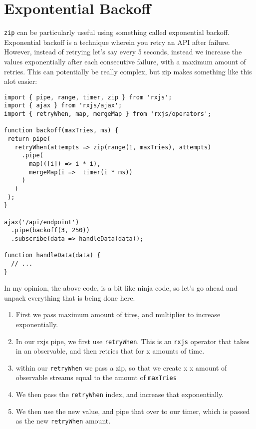 \section{Expontential Backoff}
\lstinline{zip} can be particularly useful using something called exponential 
backoff. Exponential backoff is a technique wherein you retry an API after 
failure. However, instead of retrying let's say every 5 seconds, instead 
we increase the values exponentially after each consecutive failure, with a 
maximum amount of retries. This can potentially be really complex, but zip 
makes something like this alot easier:

\begin{lstlisting}
import { pipe, range, timer, zip } from 'rxjs';
import { ajax } from 'rxjs/ajax';
import { retryWhen, map, mergeMap } from 'rxjs/operators';

function backoff(maxTries, ms) {
 return pipe(
   retryWhen(attempts => zip(range(1, maxTries), attempts)
     .pipe(
       map(([i]) => i * i),
       mergeMap(i =>  timer(i * ms))
     )
   )
 );
}

ajax('/api/endpoint')
  .pipe(backoff(3, 250))
  .subscribe(data => handleData(data));

function handleData(data) {
  // ...
}
\end{lstlisting}

In my opinion, the above code, is a bit like ninja code, so let's go ahead and
unpack everything that is being done here. 
\begin{enumerate}
  \item First we pass maximum amount of tires, and multiplier to increase 
  exponentially.
  \item In our rxjs pipe, we first use \lstinline{retryWhen}. This is an 
  \lstinline{rxjs} operator that takes in an observable, and then retries 
  that for x amounts of time.
  \item within our \lstinline{retryWhen} we pass a zip, so that we create x 
  x amount of observable streams equal to the amount of \lstinline{maxTries}
  \item We then pass the \lstinline{retryWhen} index, and increase that 
  exponentially.
  \item We then use the new value, and pipe that over to our timer, 
  which is passed as the new \lstinline{retryWhen} amount.
\end{enumerate}